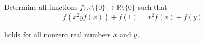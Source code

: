 Determine all functions $f:\mathbb{R}\setminus\{0\}\to \mathbb{R}\setminus\{0\}$ such that$$f(x^2yf(x))+f(1)=x^2f(x)+f(y)$$

holds for all nonzero real numbers $x$ and $y$.